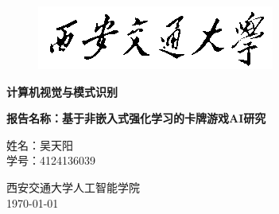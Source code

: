 \documentclass[openany,twoside,nofonts,AutoFakeBold,UTF8]{ctexbook}
\begin{document}





\begin{titlepage}
\begin{figure}[htbp]
  \centering
  \includegraphics[width=0.8\linewidth]{../../../校徽/XJTU_logo.png}
\end{figure}
\centering\bfseries{} 计算机视觉与模式识别\\[2ex]
{{
  \vspace{5ex}
  \begin{center}
  \bf
  \noindent 报告名称：基于非嵌入式强化学习的卡牌游戏AI研究
  \end{center}
  \vspace{2ex}
}
{
  \begin{center}
    姓名：吴天阳\\
    学号：4124136039\\
  \end{center}
}}
{
  \vfill
  \begin{center}
  西安交通大学\quad 人工智能学院\\[2ex]
  \today %
  \end{center}
}
\end{titlepage}


\frontmatter

% 
% 
% 
\end{document}
